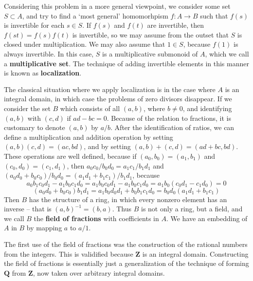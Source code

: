 Considering this problem in a more general viewpoint, we consider some set $S \subset A$, and try to find a `most general' homomorhpism $f: A \to B$ such that $f(s)$ is invertible for each $s \in S$. If $f(s)$ and $f(t)$ are invertible, then $f(st) = f(s)f(t)$ is invertible, so we may assume from the outset that $S$ is closed under multiplication. We may also assume that $1 \in S$, because $f(1)$ is always invertible. In this case, $S$ is a multiplicative submonoid of $A$, which we call a {\bf multiplicative set}. The technique of adding invertible elements in this manner is known as {\bf localization}.

The classical situation where we apply localization is in the case where $A$ is an integral domain, in which case the problems of zero divisors disappear. If we consider the set $B$ which consists of all $(a,b)$, where $b \neq 0$, and identifying $(a,b)$ with $(c,d)$ if $ad - bc = 0$. Because of the relation to fractions, it is customary to denote $(a,b)$ by $a/b$. After the identification of ratios, we can define a multiplication and addition operation by setting $(a,b)(c,d) = (ac,bd)$, and by setting $(a,b) + (c,d) = (ad + bc, bd)$. These operations are well defined, because if $(a_0,b_0) = (a_1,b_1)$ and $(c_0,d_0) = (c_1,d_1)$, then $a_0c_0/b_0d_0 = a_1c_1/b_1d_1$ and $(a_0d_0 + b_0c_0)/b_0d_0 = (a_1d_1 + b_1c_1)/b_1d_1$, because
%
\[ a_0b_1c_0d_1 - a_1b_0c_1d_0 = a_1b_0c_0d_1 - a_1b_0c_1d_0 = a_1b_0(c_0d_1 - c_1d_0) = 0 \]
%
\[ (a_0d_0 + b_0c_0)b_1d_1 = a_1b_0d_0d_1 + b_0b_1c_1d_0 = b_0d_0(a_1d_1 + b_1c_1) \]
%
Then $B$ has the structure of a ring, in which every nonzero element has an inverse -- that is $(a,b)^{-1} = (b,a)$. Thus $B$ is not only a ring, but a field, and we call $B$ the {\bf field of fractions} with coefficients in $A$. We have an embedding of $A$ in $B$ by mapping $a$ to $a/1$.

\begin{example}
    The first use of the field of fractions was the construction of the rational numbers from the integers. This is validified because $\mathbf{Z}$ is an integral domain. Constructing the field of fractions is essentially just a generalization of the technique of forming $\mathbf{Q}$ from $\mathbf{Z}$, now taken over arbitrary integral domains.
\end{example}

